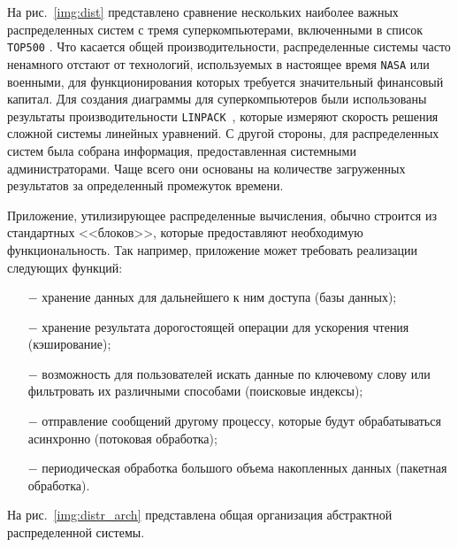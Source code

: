 На рис.~\ref{img:dist} представлено сравнение нескольких наиболее важных распределенных систем с тремя суперкомпьютерами, включенными в список \texttt{TOP500} \cite{top500}. 
Что касается общей производительности, распределенные системы часто ненамного отстают от технологий, используемых в настоящее время \texttt{NASA} или военными, для функционирования которых требуется значительный финансовый капитал. 
Для создания диаграммы для суперкомпьютеров были использованы результаты производительности \texttt{LINPACK}~\cite{linpack}, которые измеряют скорость решения сложной системы линейных уравнений. 
С другой стороны, для распределенных систем была собрана информация, предоставленная системными администраторами.
Чаще всего они основаны на количестве загруженных результатов за определенный промежуток времени.


Приложение, утилизирующее распределенные вычисления, обычно строится из стандартных <<блоков>>, которые предоставляют необходимую функциональность.
Так например, приложение может требовать реализации следующих функций:
\begin{itemize}
  \item[$-$] хранение данных для дальнейшего к ним доступа (базы данных);
  \item[$-$] хранение результата дорогостоящей операции для ускорения чтения (кэширование);
  \item[$-$] возможность для пользователей искать данные по ключевому слову или фильтровать их различными способами (поисковые индексы);
  \item[$-$] отправление сообщений другому процессу, которые будут обрабатываться асинхронно (потоковая обработка);
  \item[$-$] периодическая обработка большого объема накопленных данных (пакетная обработка).
\end{itemize}

На рис.~\ref{img:distr_arch} представлена общая организация абстрактной распределенной системы.


